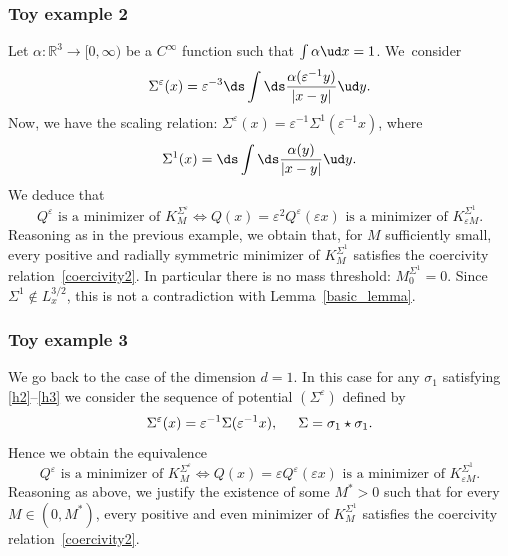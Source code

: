 \subsubsection*{Toy example 2}
Let $\alpha:\mathbb R^3\to [0,\infty)$ be a $C^\infty$ function such that $\int \alpha\ud x=1$. We~consider
\[
\Sigma^{\varepsilon}(x)=\varepsilon^{-3}\ds\int \ds\frac{\alpha(\varepsilon^{-1}y)}{|x-y|}\ud y.
\]
Now, we have the scaling relation: $\Sigma^{\varepsilon}(x)=\varepsilon^{-1}\Sigma^{1}(\varepsilon^{-1}x)$, where
\[
\Sigma^{1}(x)=\ds\int \ds\frac{\alpha(y)}{|x-y|}\ud y.
\]
We deduce that
\[
Q^{\varepsilon} \text{ is a minimizer of } K_{M}^{\Sigma^{\varepsilon}} \iff Q(x)=\varepsilon^{2}Q^{\varepsilon}(\varepsilon x) \text{ is a minimizer of } K_{\varepsilon M}^{\Sigma^{1}}.
\]
Reasoning as in the previous example, we obtain that, for $M$ sufficiently small, every positive and radially symmetric minimizer of $K_{M}^{\Sigma^{1}}$ satisfies the coercivity relation~\eqref{coercivity2}. In particular there is no mass threshold: $M_{0}^{\Sigma^{1}}=0$. Since $\Sigma^{1}\notin L_{x}^{3/2}$, this is not a contradiction with Lemma~\ref{basic_lemma}.

\subsubsection*{Toy example 3}
We go back to the case of the dimension $d=1$. In this case for any $\sigma_{1}$ satisfying \eqref{h2}--\eqref{h3} we consider the sequence of potential $(\Sigma^{\varepsilon})$ defined by
\[
\Sigma^{\varepsilon}(x)=\varepsilon^{-1}\Sigma(\varepsilon^{-1}x), \hspace{0.5cm} \Sigma=\sigma_{1}\star\sigma_{1}.
\]
Hence we obtain the equivalence
\[
Q^{\varepsilon} \text{ is a minimizer of } K_{M}^{\Sigma^{\varepsilon}} \iff Q(x)=\varepsilon Q^{\varepsilon}(\varepsilon x) \text{ is a minimizer of } K_{\varepsilon M}^{\Sigma^{1}}.
\]
Reasoning as above, we justify the existence of some $M^{*}>0$ such that for every $M\in(0,M^{*})$, every positive and even minimizer of $K_{M}^{\Sigma^{1}}$ satisfies the coercivity relation~\eqref{coercivity2}.

